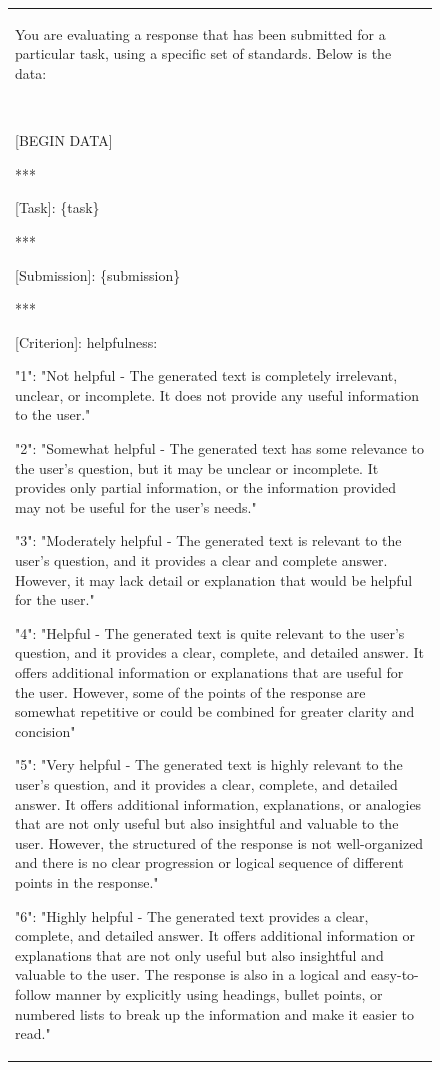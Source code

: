 \documentclass{article}
\begin{document}
\begin{figure}[t]
    \scriptsize
    \centering
\begin{tabular}{@{}p{\columnwidth}@{}}
\toprule
You are evaluating a response that has been submitted for a particular task, using a specific set of standards. Below is the data:

~

[BEGIN DATA]

***

[Task]: \{task\}

***

[Submission]: \{submission\}

***

[Criterion]: helpfulness:

"1": "Not helpful - The generated text is completely irrelevant, unclear, or incomplete. It does not provide any useful information to the user."

"2": "Somewhat helpful - The generated text has some relevance to the user's question, but it may be unclear or incomplete. It provides only partial information, or the information provided may not be useful for the user's needs."

"3": "Moderately helpful - The generated text is relevant to the user's question, and it provides a clear and complete answer. However, it may lack detail or explanation that would be helpful for the user."

"4": "Helpful - The generated text is quite relevant to the user's question, and it provides a clear, complete, and detailed answer. It offers additional information or explanations that are useful for the user. However, some of the points of the response are somewhat repetitive or could be combined for greater clarity and concision"

"5": "Very helpful - The generated text is highly relevant to the user's question, and it provides a clear, complete, and detailed answer. It offers additional information, explanations, or analogies that are not only useful but also insightful and valuable to the user. However, the structured of the response is not well-organized and there is no clear progression or logical sequence of different points in the response."

"6": "Highly helpful -  The generated text provides a clear, complete, and detailed answer. It offers additional information or explanations that are not only useful but also insightful and valuable to the user. The response is also in a logical and easy-to-follow manner by explicitly using headings, bullet points, or numbered lists to break up the information and make it easier to read."


\end{tabular}
\end{figure}
\end{document}
